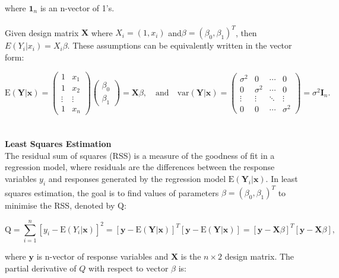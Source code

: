 \documentclass{article}\usepackage[]{graphicx}\usepackage[]{xcolor}
\begin{document}
\\
\noindent
where $\mathbf{1}_n$ is an n-vector of 1's.
\\  
\\Given design matrix $\mathbf{X}$ where $X_i = (1, x_i)$ and$\beta = (\beta_0, \beta_1)^T$, then $E(Y_i|x_i) = X_i \beta$. These assumptions can be equivalently written in the vector form:

\[\mathrm{E}(\mathbf{Y} | \mathbf{x}) = 
\left( \begin{array}{cc}
1 & x_1\\
1 & x_2\\
\vdots& \vdots\\
1 & x_n
\end{array} \right) 
\left( \begin{array}{cc}
\beta_0 \\
\beta_1
\end{array} \right) = \mathbf{X} \beta, \quad \text{and} \quad
\text{var}(\mathbf{Y} | \mathbf{x}) =
\begin{pmatrix}
\sigma^2 & 0 & \cdots & 0 \\
0 & \sigma^2 & \cdots & 0 \\
\vdots & \vdots & \ddots & \vdots \\
0 & 0 & \cdots & \sigma^2
\end{pmatrix} = \sigma^2 \mathbf{I}_n.
\]
\\  
\\
\noindent
\textbf{Least Squares Estimation}
\\ \noindent
The residual sum of squares (RSS) is a measure of the goodness of fit in a regression model, where residuals are the differences between the response variables $y_i$ and responses generated by the regression model $\mathrm{E}(\mathbf{Y}_i | \mathbf{x})$. In least squares estimation, the goal is to find values of parameters $\beta = (\beta_0, \beta_1)^T$ to minimise the RSS, denoted by $\mathrm{Q}$: 

\begin{equation*}
\mathrm{Q} = \sum_{i=1}^{n} [y_i - \mathrm{E} (Y_i | \mathbf{x})]^2 
           = [\mathbf{y}- \mathrm{E} (\mathbf{Y} | \mathbf{x})]^{T} [\mathbf{y}- \mathrm{E} (\mathbf{Y} | \mathbf{x})] 
           = [\mathbf{y}- \mathbf{X} \beta]^{T} [\mathbf{y}- \mathbf{X} \beta],
\end{equation*}

\noindent
where $\mathbf{y}$ is n-vector of response variables and $\mathbf{X}$ is the $n \times 2$ design matrix. The partial derivative of $Q$ with respect to vector $\beta$ is:
\end{document}
